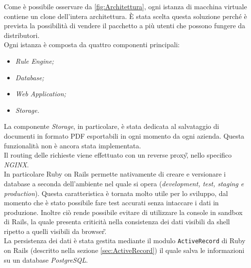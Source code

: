 Come è possibile osservare da \autoref{fig:Architettura}, ogni istanza di macchina virtuale contiene un clone dell'intera architettura. È stata scelta questa soluzione perché è prevista la possibilità di vendere il pacchetto a più utenti che possono fungere da distributori.\\
Ogni istanza è composta da quattro componenti principali:
\begin{itemize}
	\item \textit{Rule Engine;}
	\item \textit{Database;}
	\item \textit{Web Application;}
	\item \textit{Storage.}
\end{itemize}
La componente \textit{Storage}, in particolare, è stata dedicata al salvataggio di documenti in formato PDF esportabili in ogni momento da ogni azienda. Questa funzionalità non è ancora stata implementata. \\
Il routing delle richieste viene effettuato con un \gls{reverse proxy}\G, nello specifico \textit{NGINX}. \\
In particolare Ruby on Rails permette nativamente di creare e versionare i database a seconda dell'ambiente nel quale si opera (\textit{development, test, staging e production}). Questa caratteristica è tornata molto utile per lo sviluppo, dal momento che è stato possibile fare test accurati senza intaccare i dati in produzione. Inoltre ciò rende possibile evitare di utilizzare la console in sandbox di Rails, la quale presenta criticità nella consistenza dei dati visibili da shell ripetto a quelli visibili da \gls{browser}\G. \\
La persistenza dei dati è stata gestita mediante il modulo \texttt{ActiveRecord} di Ruby on Rails (descritto nella sezione \ref{sec:ActiveRecord}) il quale salva le informazioni su un database \textit{ PostgreSQL}.
